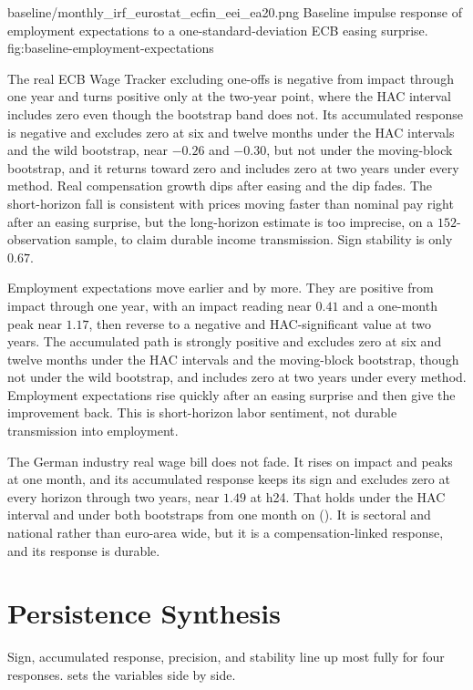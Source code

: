 \thesisfigure
  {baseline/monthly_irf_eurostat_ecfin_eei_ea20.png}
  {Baseline impulse response of employment expectations to a one-standard-deviation ECB easing surprise.}
  {fig:baseline-employment-expectations}

The real ECB Wage Tracker excluding one-offs is negative from impact through one year and turns positive only at the two-year point, where the HAC interval includes zero even though the bootstrap band does not. Its accumulated response is negative and excludes zero at six and twelve months under the HAC intervals and the wild bootstrap, near \(-0.26\) and \(-0.30\), but not under the moving-block bootstrap, and it returns toward zero and includes zero at two years under every method. Real compensation growth dips after easing and the dip fades. The short-horizon fall is consistent with prices moving faster than nominal pay right after an easing surprise, but the long-horizon estimate is too imprecise, on a \(152\)-observation sample, to claim durable income transmission. Sign stability is only \(0.67\).

Employment expectations move earlier and by more. They are positive from impact through one year, with an impact reading near \(0.41\) and a one-month peak near \(1.17\), then reverse to a negative and HAC-significant value at two years. The accumulated path is strongly positive and excludes zero at six and twelve months under the HAC intervals and the moving-block bootstrap, though not under the wild bootstrap, and includes zero at two years under every method. Employment expectations rise quickly after an easing surprise and then give the improvement back. This is short-horizon labor sentiment, not durable transmission into employment.

The German industry real wage bill does not fade. It rises on impact and peaks at one month, and its accumulated response keeps its sign and excludes zero at every horizon through two years, near \(1.49\) at h24. That holds under the HAC interval and under both bootstraps from one month on (). It is sectoral and national rather than euro-area wide, but it is a compensation-linked response, and its response is durable.

\section{Persistence Synthesis}

Sign, accumulated response, precision, and stability line up most fully for four responses.  sets the variables side by side.


